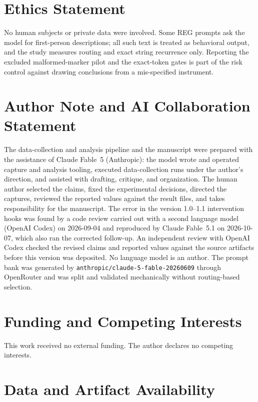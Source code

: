 \documentclass[10pt,a4paper,twocolumn]{article}
\begin{document}
\section*{Ethics Statement}

No human subjects or private data were involved. Some REG prompts ask the
model for first-person descriptions; all such text is treated as behavioral
output, and the study measures routing and exact string recurrence only.
Reporting the excluded malformed-marker pilot and the exact-token gates is
part of the risk control against drawing conclusions from a mis-specified
instrument.

\section*{Author Note and AI Collaboration Statement}

The data-collection and analysis pipeline and the manuscript were prepared
with the assistance of Claude Fable~5 (Anthropic): the model wrote and
operated capture and analysis tooling, executed data-collection runs under the
author's direction, and assisted with drafting, critique, and organization.
The human author selected the claims, fixed the experimental decisions,
directed the captures, reviewed the reported values against the result files,
and takes responsibility for the manuscript. The error in the version
1.0--1.1 intervention hooks was found by a code review carried out with a
second language model (OpenAI Codex) on 2026-09-04 and reproduced by Claude
Fable~5.1 on 2026-10-07, which also ran the corrected follow-up. An independent review with OpenAI
Codex checked the revised claims and reported values against the source
artifacts before this version was deposited. No language model is an
author.
The prompt bank was generated by \texttt{anthropic/claude-5-fable-20260609}
through OpenRouter and was split and validated mechanically without
routing-based selection.

\section*{Funding and Competing Interests}

This work received no external funding. The author declares no competing
interests.

\section*{Data and Artifact Availability}
\end{document}
